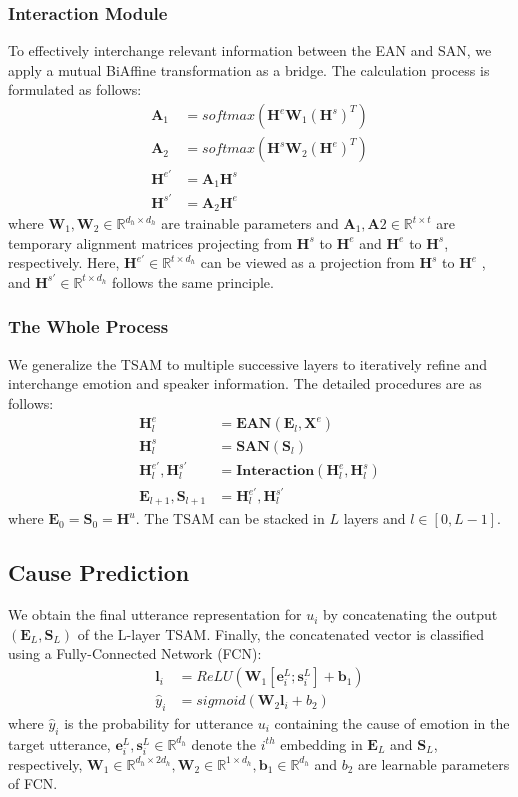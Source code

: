 \documentclass[11pt]{article}
\begin{document}
\subsubsection{Interaction Module}
To effectively interchange relevant information between the EAN and SAN, we apply a mutual BiAffine transformation as a bridge. The calculation process is formulated as follows:
\begin{align}
    \bm{A}_1 &= \textit{softmax}(\bm{H}^e\bm{W}_1(\bm{H}^s)^T)\\
    \bm{A}_2 &= \textit{softmax}(\bm{H}^s\bm{W}_2(\bm{H}^e)^T)\\
    \bm{H}^{e'} &= \bm{A}_1\bm{H}^s\\
    \bm{H}^{s'} &= \bm{A}_2\bm{H}^e
\end{align}
where $\bm{W}_1,\bm{W}_2\in \mathbb{R}^{d_h\times d_h}$ are trainable parameters and $\bm{A}_1, \bm{A}2\in \mathbb{R}^{t\times t}$ are temporary alignment matrices projecting from $\bm{H}^s$ to $\bm{H}^e$ and $\bm{H}^e$ to $\bm{H}^s$, respectively. Here, $\bm{H}^{e'}\in \mathbb{R}^{t\times d_h}$ can be viewed as a projection from $\bm{H}^s$ to $\bm{H}^e$ , and $\bm{H}^{s'}\in \mathbb{R}^{t\times d_h}$ follows the same principle.

\subsubsection{The Whole Process}
We generalize the TSAM to multiple successive layers to iteratively refine and interchange emotion and speaker information. The detailed procedures are as follows:
\begin{align}
   \bm{H}^e_l &= \textbf{EAN}(\bm{E}_l, \bm{X}^e) \\
   \bm{H}^s_l &= \textbf{SAN}(\bm{S}_l) \\
   \bm{H}^{e'}_l, \bm{H}^{s'}_l &= \textbf{Interaction}(\bm{H}^e_l,  \bm{H}^s_l)\\
   \bm{E}_{l+1}, \bm{S}_{l+1} &=  \bm{H}^{e'}_l, \bm{H}^{s'}_l
\end{align}
where $\bm{E}_0=\bm{S}_0=\bm{H}^u$. The TSAM can be stacked in $L$ layers and $l\in [0,L-1]$. 



\subsection{Cause Prediction}
We obtain the final utterance representation for $u_i$ by concatenating the output $(\bm{E}_L,\bm{S}_L)$ of the L-layer TSAM. Finally, the concatenated vector is classified using a Fully-Connected Network (FCN):
\begin{align}
    \bm{l}_i &= \textit{ReLU}(\bm{W}_1[\bm{e}^L_i;\bm{s}^L_i]+\bm{b}_1)\\
    \hat{y}_i &= \textit{sigmoid}(\bm{W}_2\bm{l}_i+b_2)
\end{align}
where $\hat{y}_i$ is the probability for utterance $u_i$ containing the cause of emotion in the target utterance, $\bm{e}^L_i, \bm{s}^L_i\in \mathbb{R}^{d_h}$ denote the $i^{th}$ embedding in $\bm{E}_L$ and $\bm{S}_L$, respectively, $\bm{W}_1\in\mathbb{R}^{d_h\times 2d_h}, \bm{W}_2\in \mathbb{R}^{1\times d_h}, \bm{b}_1\in \mathbb{R}^{d_h}$ and $b_2$ are learnable parameters of FCN. 
\end{document}
